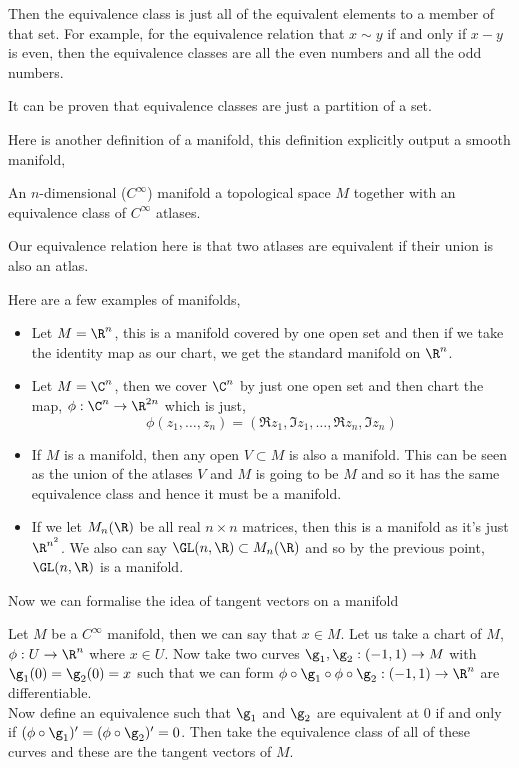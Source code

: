 Then the equivalence class is just all of the equivalent elements to a member of that set. For example, for the equivalence relation that $x \sim y$ if and only if $x - y$ is even, then the equivalence classes are all the even numbers and all the odd numbers.

\begin{remark}
   It can be proven that equivalence classes are just a partition of a set. \cite{Buzzard-2020}
\end{remark}

Here is another definition of a manifold, this definition explicitly output a smooth manifold,
\begin{ndefi}
  An $n$-dimensional ($C^\infty$) manifold a topological space $M$ together with an equivalence class of $C^\infty$ atlases.
\end{ndefi}
\begin{remark}
   Our equivalence relation here is that two atlases are equivalent if their union is also an atlas.
\end{remark}

Here are a few examples of manifolds,
\begin{itemize}
  \item Let $M = \R^n$, this is a manifold covered by one open set and then if we take the identity map as our chart, we get the standard manifold on $\R^n$.
  \item Let $M = \C^n$, then we cover $\C^n$ by just one open set and then chart the map, $\phi : \C^n \to \R^{2n}$ which is  just,
  $$ \phi (z_1, \dots, z_n) = (\Re z_1, \Im z_1, \dots, \Re z_n, \Im z_n) $$
  \item If $M$ is a manifold, then any open $V \subset M$ is also a manifold. This can be seen as the union of the atlases $V$ and $M$ is going to be $M$ and so it has the same equivalence class and hence it must be a manifold.
  \item If we let $M_n (\R)$ be all real $n \times n$ matrices, then this is a manifold as it's just $\R^{n^2}$. We also can say $\GL(n, \R) \subset M_n(\R)$ and so by the previous point, $\GL(n, \R)$ is a manifold.
\end{itemize}

Now we can formalise the idea of tangent vectors on a manifold\cite{Lee-2009}
\begin{ndefi}
  Let $M$ be a $C^\infty$ manifold, then we can say that $x \in M$. Let us take a chart of $M$, $\phi : U \to \R^n$ where $x \in U$. Now take two curves $\g_1, \g_2 : (-1, 1) \to M$ with $\g_1(0) = \g_2(0) = x$ such that we can form $\phi \circ \g_1 \circ \phi \circ \g_2 : (-1, 1) \to \R^n$ are differentiable. \\
  Now define an equivalence such that $\g_1$ and $\g_2$ are equivalent at $0$ if and only if $(\phi \circ \g_1)' = (\phi \circ \g_2)' = 0$. Then take the equivalence class of all of these curves and these are the tangent vectors of $M$.
\end{ndefi}

